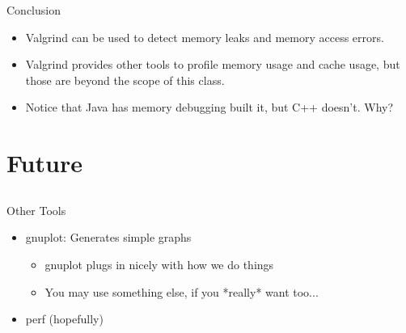 \documentclass{beamer}
\begin{document}
\begin{frame}{Conclusion}
\begin{itemize}
\item Valgrind can be used to detect memory leaks and memory access errors.
\item Valgrind provides other tools to profile memory usage and cache usage, but those are beyond the scope of this class.
\item Notice that Java has memory debugging built it, but C++ doesn't.  Why?
\end{itemize}
\end{frame}

\section{Future}
\subsection{}

\begin{frame}{Other Tools}
\begin{itemize}
\item gnuplot: Generates simple graphs
\begin{itemize}
\item gnuplot plugs in nicely with how we do things
\item You may use something else, if you *really* want too...
\end{itemize}
\item perf (hopefully)
\end{itemize}
\end{frame}
\end{document}
